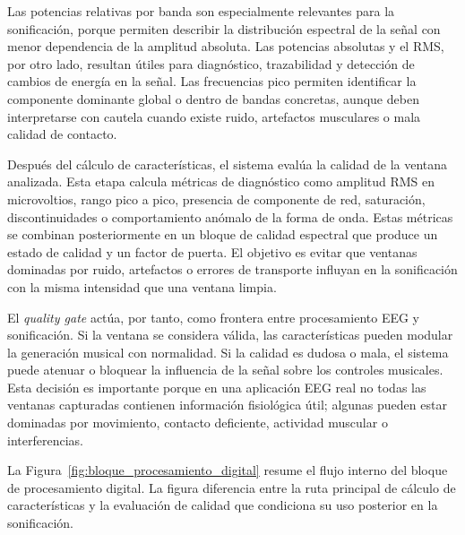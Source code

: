 \documentclass[../main.tex]{subfiles}
\begin{document}
Las potencias relativas por banda son especialmente relevantes para la sonificación, porque permiten describir la distribución espectral de la señal con menor dependencia de la amplitud absoluta. Las potencias absolutas y el RMS, por otro lado, resultan útiles para diagnóstico, trazabilidad y detección de cambios de energía en la señal. Las frecuencias pico permiten identificar la componente dominante global o dentro de bandas concretas, aunque deben interpretarse con cautela cuando existe ruido, artefactos musculares o mala calidad de contacto.

Después del cálculo de características, el sistema evalúa la calidad de la ventana analizada. Esta etapa calcula métricas de diagnóstico como amplitud RMS en microvoltios, rango pico a pico, presencia de componente de red, saturación, discontinuidades o comportamiento anómalo de la forma de onda. Estas métricas se combinan posteriormente en un bloque de calidad espectral que produce un estado de calidad y un factor de puerta. El objetivo es evitar que ventanas dominadas por ruido, artefactos o errores de transporte influyan en la sonificación con la misma intensidad que una ventana limpia.

El \textit{quality gate} actúa, por tanto, como frontera entre procesamiento EEG y sonificación. Si la ventana se considera válida, las características pueden modular la generación musical con normalidad. Si la calidad es dudosa o mala, el sistema puede atenuar o bloquear la influencia de la señal sobre los controles musicales. Esta decisión es importante porque en una aplicación EEG real no todas las ventanas capturadas contienen información fisiológica útil; algunas pueden estar dominadas por movimiento, contacto deficiente, actividad muscular o interferencias.

La Figura~\ref{fig:bloque_procesamiento_digital} resume el flujo interno del bloque de procesamiento digital. La figura diferencia entre la ruta principal de cálculo de características y la evaluación de calidad que condiciona su uso posterior en la sonificación.
\end{document}
